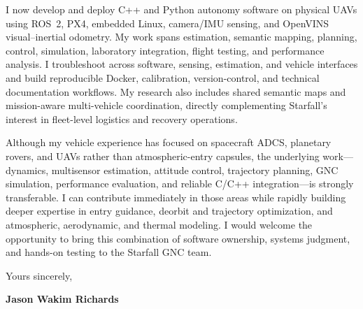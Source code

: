\documentclass[10pt,a4paper]{article}
\newcommand{\BodySize}{9.25pt}
\newcommand{\BodyLineSize}{12.1pt}
\newcommand{\ParagraphSpacing}{10pt}       %
\newcommand{\ClosingBefore}{7pt}          %
\newcommand{\SignatureSpace}{22pt}         %
\newcommand{\LetterParagraph}[1]{%
    \noindent #1\par
    \addvspace{\ParagraphSpacing}%
}
\newcommand{\LetterFinalParagraph}[1]{%
    \noindent #1\par
}
\begin{document}
{    \LetterParagraph{%
        I now develop and deploy C++ and Python autonomy software on physical UAVs using
        ROS~2, PX4, embedded Linux, camera/IMU sensing, and OpenVINS visual--inertial
        odometry. My work spans estimation, semantic mapping, planning, control,
        simulation, laboratory integration, flight testing, and performance analysis. I
        troubleshoot across software, sensing, estimation, and vehicle interfaces and
        build reproducible Docker, calibration, version-control, and technical
        documentation workflows. My research also includes shared semantic maps and
        mission-aware multi-vehicle coordination, directly complementing Starfall's
        interest in fleet-level logistics and recovery operations.%
    }

    \LetterFinalParagraph{%
        Although my vehicle experience has focused on spacecraft ADCS, planetary rovers,
        and UAVs rather than atmospheric-entry capsules, the underlying work---dynamics,
        multisensor estimation, attitude control, trajectory planning, GNC simulation,
        performance evaluation, and reliable C/C++ integration---is strongly
        transferable. I can contribute immediately in those areas while rapidly building
        deeper expertise in entry guidance, deorbit and trajectory optimization, and
        atmospheric, aerodynamic, and thermal modeling. I would welcome the opportunity
        to bring this combination of software ownership, systems judgment, and hands-on
        testing to the Starfall GNC team.%
    }
}


\vspace{\ClosingBefore}

{\fontsize{\BodySize}{\BodyLineSize}\selectfont
    \textcolor{CVDarkGray}{Yours sincerely,}}

\vspace{\SignatureSpace}

{\fontsize{\BodySize}{\BodyLineSize}\selectfont
    \textbf{\textcolor{CVBlack}{Jason Wakim Richards}}}
\end{document}
